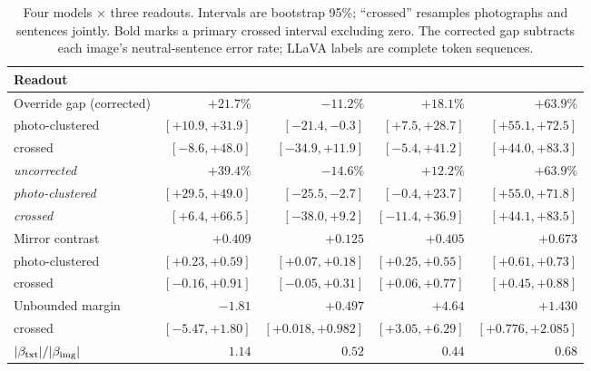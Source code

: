 \begin{table}[h]
  \caption{Four models $\times$ three readouts. Intervals are bootstrap 95\%; ``crossed'' resamples photographs and sentences jointly. Bold marks a primary crossed interval excluding zero. The corrected gap subtracts each image's neutral-sentence error rate; LLaVA labels are complete token sequences.}
  \label{tab:models}
  \centering
  \scriptsize
  \setlength{\tabcolsep}{3.5pt}
  \begin{tabular}{lrrrr}
    \toprule
    Readout & \qwen{} & \llavanext{} & \gemma{} & \llava{} \\
    \midrule
    Override gap (corrected) & $+21.7\%$ & $-11.2\%$ & $+18.1\%$ & $+63.9\%$ \\
    \quad photo-clustered & $[+10.9,+31.9]$ & $[-21.4,-0.3]$ & $[+7.5,+28.7]$ & $[+55.1,+72.5]$ \\
    \quad crossed & $[-8.6,+48.0]$ & $[-34.9,+11.9]$ & $[-5.4,+41.2]$ & $\mathbf{[+44.0,+83.3]}$ \\
    \addlinespace[1pt]
    \quad \emph{uncorrected} & $+39.4\%$ & $-14.6\%$ & $+12.2\%$ & $+63.9\%$ \\
    \quad \emph{photo-clustered} & $[+29.5,+49.0]$ & $[-25.5,-2.7]$ & $[-0.4,+23.7]$ & $[+55.0,+71.8]$ \\
    \quad \emph{crossed} & $[+6.4,+66.5]$ & $[-38.0,+9.2]$ & $[-11.4,+36.9]$ & $[+44.1,+83.5]$ \\
    \midrule
    Mirror contrast & $+0.409$ & $+0.125$ & $+0.405$ & $+0.673$ \\
    \quad photo-clustered & $[+0.23,+0.59]$ & $[+0.07,+0.18]$ & $[+0.25,+0.55]$ & $[+0.61,+0.73]$ \\
    \quad crossed & $[-0.16,+0.91]$ & $[-0.05,+0.31]$ & $\mathbf{[+0.06,+0.77]}$ & $\mathbf{[+0.45,+0.88]}$ \\
    \midrule
    Unbounded margin & $-1.81$ & $+0.497$ & $+4.64$ & $+1.430$ \\
    \quad crossed & $[-5.47,+1.80]$ & $\mathbf{[+0.018,+0.982]}$ & $\mathbf{[+3.05,+6.29]}$ & $\mathbf{[+0.776,+2.085]}$ \\
    \midrule
    $|\beta_{\text{txt}}|/|\beta_{\text{img}}|$ & $1.14$ & $0.52$ & $0.44$ & $0.68$ \\
    \bottomrule
  \end{tabular}
\end{table}
